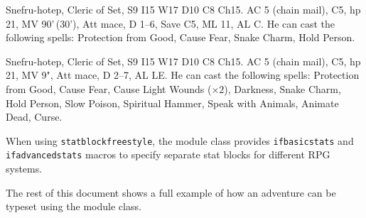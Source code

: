 \documentclass[a4paper,serif]{module}
\begin{document}

\begin{statblockfreestyle}
\begin{ifbasicstats}
Snefru-hotep, Cleric of Set, S9 I15 W17 D10 C8 Ch15. AC 5 (chain mail), C5, hp 21, MV 90'\,(30'), Att mace, D 1--6, Save C5, ML 11, AL C.
He can cast the following spells: Protection from Good, Cause Fear, Snake Charm, Hold Person.
\end{ifbasicstats}
\begin{ifadvancedstats}
Snefru-hotep, Cleric of Set, S9 I15 W17 D10 C8 Ch15. AC 5 (chain mail), C5, hp 21, MV 9", Att mace, D 2--7, AL LE.
He can cast the following spells: Protection from Good, Cause Fear, Cause Light Wounds ($\times 2$), Darkness,
Snake Charm, Hold Person, Slow Poison, Spiritual Hammer, Speak with Animals, Animate Dead, Curse.
\end{ifadvancedstats}
\end{statblockfreestyle}

\noindent When using \verb|statblockfreestyle|, the module class provides \verb|ifbasicstats| and \verb|ifadvancedstats| macros to specify separate
stat blocks for different RPG systems.

The rest of this document shows a full example of how an adventure can be typeset using the module class.

\newpage


\end{document}
